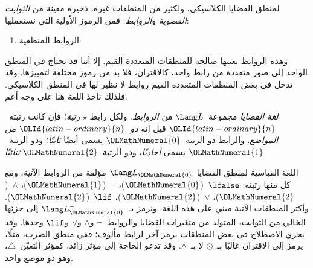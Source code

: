 \documentclass[../../../include/open-logic-section]{subfiles}
\begin{document}


لمنطق القضايا الكلاسيكي، ولكثير من المنطقات غيره، ذخيرة معينة من
\emph{الثوابت القضوية} و\emph{الروابط}. فمن الرموز الأولية التي
نستعملها:
\begin{enumerate}
\item الروابط المنطقية:
  \startycommalist
\end{enumerate}

وهذه الروابط بعينها صالحة للمنطقات المتعددة القيم. إلا أننا قد نحتاج
في المنطق الواحد إلى صور متعددة من رابط واحد، كالاقتران، فلا بد من
رموز مختلفة لتمييزها. وقد تدخل في بعض المنطقات المتعددة القيم روابط
لا نظير لها في المنطق الكلاسيكي. فلذلك نأخذ اللغة هنا على وجه أعم.

\begin{defn}
  \emph{لغة القضايا} مجموعة~$\Lang L$ من \emph{الروابط}. ولكل رابط
  $\star$ \emph{رتبة}؛ فإن كانت رتبته~${\OLId{latin-ordinary}{n}}$ قيل إنه \emph{ذو~${\OLId{latin-ordinary}{n}}$ من
  المواضع}. والرابط ذو الرتبة~${\OLMathNumeral{0}}$ يسمى أيضًا \emph{ثابتًا}؛ وذو
  الرتبة~${\OLMathNumeral{1}}$ يسمى \emph{أحاديًا}، وذو الرتبة~${\OLMathNumeral{2}}$ \emph{ثنائيًا}.
\end{defn}

\begin{ex}
  اللغة القياسية لمنطق القضايا~$\Lang L_{\OLMathNumeral{0}}$ مؤلفة من الروابط الآتية،
  ومع كل منها رتبته:
  $\lfalse$~(${\OLMathNumeral{0}}$)،
  $\lnot$~(${\OLMathNumeral{1}}$)،
  $\land$~(${\OLMathNumeral{2}}$)،
  $\lor$~(${\OLMathNumeral{2}}$)،
  $\lif$~(${\OLMathNumeral{2}}$). وأكثر المنطقات الآتية مبني على هذه اللغة.
  ونرمز بـ~$\Lang L_{\OLMathNumeral{0}}^{-}$ إلى جزئها الخالي من الثوابت، المتولد من
  متغيرات القضايا والروابط~$\lnot$ و$\land$ و$\lor$ و$\lif$ وحدها.
  وقد يجري الاصطلاح في بعض المنطقات برمز آخر لرابط مألوف؛ ففي منطق
  الضرب، مثلًا، يرمز إلى الاقتران غالبًا بـ~$\odot$ لا بـ~$\land$.
  وقد تدعو الحاجة إلى مؤثر زائد، كمؤثر التعيّن~$\triangle$، وهو ذو
  موضع واحد.
\end{ex}
\end{document}
